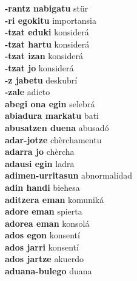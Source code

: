 \textbf{ -rantz nabigatu  } stür \\
\textbf{ -ri egokitu  } importansia \\
\textbf{ -tzat eduki  } konsiderá \\
\textbf{ -tzat hartu  } konsiderá \\
\textbf{ -tzat izan  } konsiderá \\
\textbf{ -tzat jo  } konsiderá \\
\textbf{ -z jabetu  } deskubrí \\
\textbf{ -zale  } adicto \\
\textbf{ abegi ona egin  } selebrá \\
\textbf{ abiadura markatu  } bati \\
\textbf{ abusatzen duena  } abusadó \\
\textbf{ adar-jotze  } chèrchamentu \\
\textbf{ adarra jo  } chèrcha \\
\textbf{ adausi egin  } ladra \\
\textbf{ adimen-urritasun  } abnormalidad \\
\textbf{ adin handi  } biehesa \\
\textbf{ aditzera eman  } komuniká \\
\textbf{ adore eman  } spierta \\
\textbf{ adorea eman  } konsolá \\
\textbf{ ados egon  } konsentí \\
\textbf{ ados jarri  } konsentí \\
\textbf{ ados jartze  } akuerdo \\
\textbf{ aduana-bulego  } duana \\

